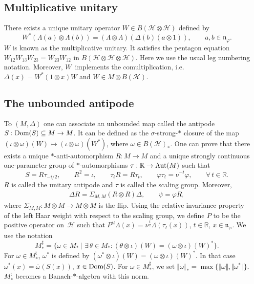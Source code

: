\documentclass[pdftex]{sigma}
\numberwithin{equation}{section}
\theoremstyle{definition}
\newcommand{\cHil}{\mathcal{H}}
\newcommand{\nphi}{\mathfrak{n}_\varphi}
\newcommand{\Dom}{\text{\rm Dom}}
\begin{document}
\subsection*{Multiplicative unitary}
There exists a unique unitary operator $W\in
B(\cHil \otimes \cHil)$ def\/ined by
\[
W^\ast \left( \Lambda (a)\otimes  \Lambda(b) \right) = \left(
\Lambda \otimes \Lambda \right) \left( \Delta (b)(a\otimes
1)\right), \qquad a,b \in \nphi.
\]
$W$ is known as the multiplicative unitary. It satisf\/ies the
pentagon equation $W_{12}W_{13}W_{23}=W_{23}W_{12}$ in $B(\cHil
\otimes \cHil \otimes \cHil)$. Here we use the usual leg numbering notation. Moreover, $W$~implements the comultiplication, i.e.\ $\Delta(x) = W^\ast (1 \otimes x) W$ and $W \in M \otimes B(\cHil)$.

\subsection*{The unbounded antipode}

To $(M, \Delta)$ one can associate an unbounded map called the antipode $S: \Dom(S) \subseteq M \rightarrow M$. It can be def\/ined as the $\sigma$-strong-$\ast$ closure of the map $(\iota \otimes \omega)(W) \mapsto (\iota \otimes \omega)(W^\ast)$, where $\omega \in B(\cHil)_\ast$.
 One can prove that there exists a unique $\ast$-anti-automorphism $R: M \rightarrow M$ and a unique strongly continuous one-parameter group of $\ast$-automorphisms $\tau: \mathbb{R} \rightarrow {\rm Aut}(M)$ such that
\[
S = R \tau_{-i/2}, \qquad R^2 = \iota, \qquad \tau_t R = R \tau_t, \qquad \varphi \tau_t = \nu^{-t} \varphi, \qquad \forall\, t \in \mathbb{R}.
\]
$R$ is called the unitary antipode and $\tau$ is called the scaling group. Moreover,
\begin{gather}\label{EqnRCom}
\Delta R = \Sigma_{M,M} (R \otimes R) \Delta, \qquad \psi = \varphi R,
\end{gather}
where $\Sigma_{M,M}: M \otimes M \rightarrow M \otimes M$ is the f\/lip. Using the relative invariance property of the left Haar weight with respect to the scaling group, we def\/ine $P$ to be the positive operator on~$\cHil$ such that $P^{it} \Lambda(x) = \nu^{\frac{t}{2}} \Lambda(\tau_t(x))$, $t \in \mathbb{R}$, $x \in \nphi$.
 We use the notation
\[
    M_\ast^{\sharp} = \big\{ \omega \in M_\ast \mid \exists\, \theta \in M_\ast: (\theta \otimes \iota)(W) = (\omega \otimes \iota)(W)^\ast \big\}.
\]
For $\omega \in M_\ast^\sharp$, $\omega^\ast$ is def\/ined by $(\omega^\ast \otimes \iota)(W) = (\omega \otimes \iota)(W)^\ast$. In that case $\omega^\ast(x) = \overline{\omega}(S(x))$, $x \in \Dom(S)$. For $\omega \in M_\ast^\sharp$, we set $\Vert \omega \Vert_\ast = \max \{\Vert \omega \Vert, \Vert \omega^\ast \Vert \}$. $M_\ast^\sharp$ becomes a Banach-$\ast$-algebra with this norm.
\end{document}
